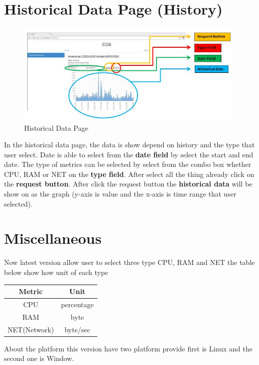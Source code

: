 \documentclass{l3proj}
\begin{document}
\begin{appendices}
\section{Historical Data Page (History)}

\begin{figure}[H]
\centering
\includegraphics[width=110mm]{Manual_Images/historical_data.JPG}
\caption{Historical Data Page}
\label{fig:Historical Data Page}
\end{figure}

In the historical data page, the data is show depend on history and the type that user select. Date is able to select from the \textbf{date field} by select the start and end date. The type of metrics can be selected by select from the combo box whether CPU, RAM or NET on the \textbf{type field}. After select all the thing already click on the \textbf{request button}. After click the request button the \textbf{historical data} will be show on as the graph (y-axis is value and the x-axis is time range that user selected). 

\section{Miscellaneous}
Now latest version allow user to select three type CPU, RAM and NET the table below show how unit of each type 

\begin{center}
  \begin{tabular}{ | c | c | }
    \hline
     \textbf{Metric} & \textbf{Unit} \\ \hline
        CPU & percentage \\ \hline 
        RAM & byte \\ \hline 
        NET(Network) & byte/sec \\ \hline 
  \end{tabular}
\end{center}

About the platform this version have two platform provide first is Linux and the second one is Window. 



\end{appendices}



\end{document}
